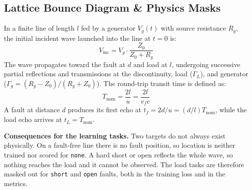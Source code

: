 \subsection{Lattice Bounce Diagram \& Physics Masks}
In a finite line of length $l$ fed by a generator $V_g(t)$ with source resistance $R_g$, the initial incident wave launched into the line at $t=0$ is:
\begin{equation}
V_{\mathrm{inc}} = V_g \cdot \frac{Z_0}{Z_0 + R_g}
\label{eq:v_inc}
\end{equation}
The wave propagates toward the fault at $d$ and load at $l$, undergoing successive partial reflections and transmissions at the discontinuity, load ($\Gamma_L$), and generator ($\Gamma_g = (R_g - Z_0)/(R_g + Z_0)$).
The round-trip transit time is defined as:
\begin{equation}
T_{\mathrm{nom}} = \frac{2 l}{u} = \frac{2 l}{v_f c}
\label{eq:t_nom}
\end{equation}
A fault at distance $d$ produces its first echo at $t_f = 2d/u = (d/l) T_{\mathrm{nom}}$, while the load echo arrives at $t_L = T_{\mathrm{nom}}$.

\textbf{Consequences for the learning tasks.} Two targets do not always exist physically. On a fault-free line there is no fault position, so location is neither trained nor scored for \texttt{none}. A hard short or open reflects the whole wave, so nothing reaches the load and it cannot be observed. The load tasks are therefore masked out for \texttt{short} and \texttt{open} faults, both in the training loss and in the metrics.

